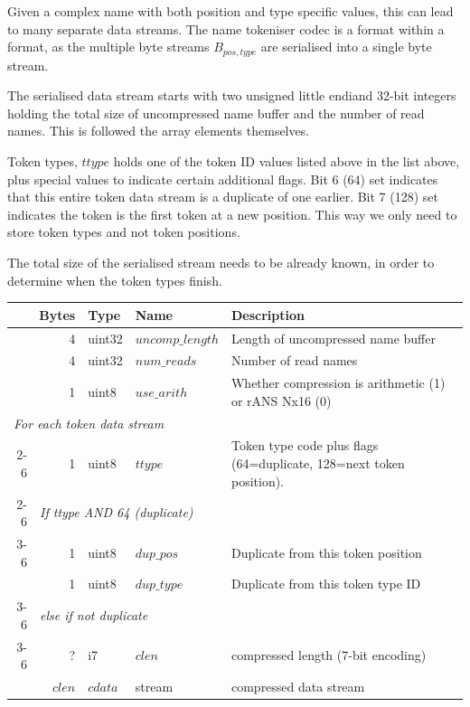 \documentclass[a4paper]{article}
\begin{document}
Given a complex name with both position and type specific values, this
can lead to many separate data streams.  The name tokeniser codec is
a format within a format, as the multiple byte streams $B_{pos,type}$
are serialised into a single byte stream.

The serialised data stream starts with two unsigned little endiand 32-bit
integers holding the total size of uncompressed name buffer and the
number of read names.  This is followed the array elements
themselves.

Token types, $ttype$ holds one of the token ID values listed above
in the list above, plus special values to indicate certain additional
flags.  Bit 6 (64) set indicates that this entire token data stream is a
duplicate of one earlier.  Bit 7 (128) set indicates the token
is the first token at a new position.  This way we only need to store
token types and not token positions.

The total size of the serialised stream needs to be already known, in
order to determine when the token types finish.

\begin{tabular}{|r|r|r|l|l|p{10cm}|}
\hline
\multicolumn{3}{|r|}{\textbf{Bytes}} & \textbf{Type} & \textbf{Name} & \textbf{Description}\\
\hline
\multicolumn{3}{|r|}{4} & uint32 & $uncomp\_length$ & Length of uncompressed name buffer\\
\multicolumn{3}{|r|}{4} & uint32 & $num\_reads$ & Number of read names\\
\multicolumn{3}{|r|}{1} & uint8  & $use\_arith$ & Whether compression is arithmetic (1) or rANS Nx16 (0)\\
\hline
\multicolumn{6}{|l|}{\quad\textit{For each token data stream}}\\
\cline{2-6}
& \multicolumn{2}{r|}{1} & uint8 & $ttype$ & Token type code plus flags (64=duplicate, 128=next token position).\\
\cline{2-6}
& \multicolumn{5}{l|}{\textit{If ttype AND 64 (duplicate)}}\\
\cline{3-6}
& & 1 & uint8 & $dup\_pos$  & Duplicate from this token position\\
& & 1 & uint8 & $dup\_type$ & Duplicate from this token type ID\\
\cline{3-6}
& \multicolumn{5}{l|}{\textit{else if not duplicate}}\\
\cline{3-6}
& & ? & i7 & $clen$ & compressed length (7-bit encoding)\\
& & $clen$ & $cdata$ & stream & compressed data stream\\
\hline
\end{tabular}
\end{document}
